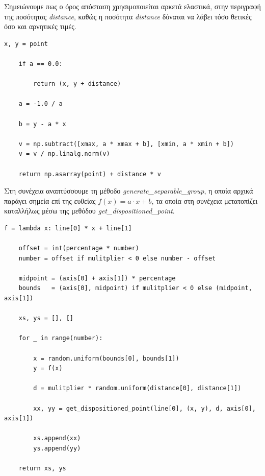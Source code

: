 \documentclass[12pt]{article}
\begin{document}
Σημειώνουμε πως ο όρος απόσταση χρησιμοποιείται αρκετά ελαστικά,
στην περιγραφή της ποσότητας \textit{distance},
καθώς η ποσότητα \textit{distance} δύναται να λάβει τόσο θετικές όσο και αρνητικές τιμές. \\

\begin{lstlisting}[caption={Η μέθοδος \textit{get\_dispositioned\_point}}]
    x, y = point

    if a == 0.0:

        return (x, y + distance)

    a = -1.0 / a

    b = y - a * x

    v = np.subtract([xmax, a * xmax + b], [xmin, a * xmin + b])
    v = v / np.linalg.norm(v)

    return np.asarray(point) + distance * v
\end{lstlisting}

\pagebreak

Στη συνέχεια αναπτύσσουμε τη μέθοδο \textit{generate\_separable\_group},
η οποία αρχικά παράγει σημεία επί της ευθείας \( f(x) = a \cdot x + b \),
τα οποία στη συνέχεια μετατοπίζει καταλλήλως μέσω της μεθόδου \textit{get\_dispositioned\_point}. \\

\begin{lstlisting}[caption={Η μέθοδος \textit{generate\_separable\_group}}]
    f = lambda x: line[0] * x + line[1]

    offset = int(percentage * number)
    number = offset if mulitplier < 0 else number - offset

    midpoint = (axis[0] + axis[1]) * percentage
    bounds   = (axis[0], midpoint) if mulitplier < 0 else (midpoint, axis[1])

    xs, ys = [], []

    for _ in range(number):

        x = random.uniform(bounds[0], bounds[1])
        y = f(x)

        d = mulitplier * random.uniform(distance[0], distance[1])

        xx, yy = get_dispositioned_point(line[0], (x, y), d, axis[0], axis[1])

        xs.append(xx)
        ys.append(yy)

    return xs, ys
\end{lstlisting}
\end{document}
